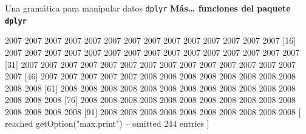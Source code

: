 \documentclass[
  ignorenonframetext,
  aspectratio=169]{beamer}
\newenvironment{Shaded}{\begin{snugshade}}{\end{snugshade}}
\newcommand{\CommentTok}[1]{\textcolor[rgb]{0.56,0.35,0.01}{\textit{#1}}}
\newcommand{\FunctionTok}[1]{\textcolor[rgb]{0.13,0.29,0.53}{\textbf{#1}}}
\newcommand{\NormalTok}[1]{#1}
\newcommand{\SpecialCharTok}[1]{\textcolor[rgb]{0.81,0.36,0.00}{\textbf{#1}}}
\let\oldverbatim\verbatim
\let\endoldverbatim\endverbatim
\renewenvironment{verbatim}{\tiny\oldverbatim}{\endoldverbatim}
\begin{document}
\begin{frame}[fragile]{Una gramática para manipular datos
\texttt{dplyr}}
\label{una-gramuxe1tica-para-manipular-datos-dplyr-17}
\textbf{Más\ldots{} funciones del paquete \texttt{dplyr}}

\begin{Shaded}
\end{Shaded}

\begin{verbatim}
  [1] 2007 2007 2007 2007 2007 2007 2007 2007 2007 2007 2007 2007 2007 2007 2007
 [16] 2007 2007 2007 2007 2007 2007 2007 2007 2007 2007 2007 2007 2007 2007 2007
 [31] 2007 2007 2007 2007 2007 2007 2007 2007 2007 2007 2007 2007 2007 2007 2007
 [46] 2007 2007 2007 2007 2007 2008 2008 2008 2008 2008 2008 2008 2008 2008 2008
 [61] 2008 2008 2008 2008 2008 2008 2008 2008 2008 2008 2008 2008 2008 2008 2008
 [76] 2008 2008 2008 2008 2008 2008 2008 2008 2008 2008 2008 2008 2008 2008 2008
 [91] 2008 2008 2008 2008 2008 2008 2008 2008 2008 2008
 [ reached getOption("max.print") -- omitted 244 entries ]
\end{verbatim}
\end{frame}
\end{document}
